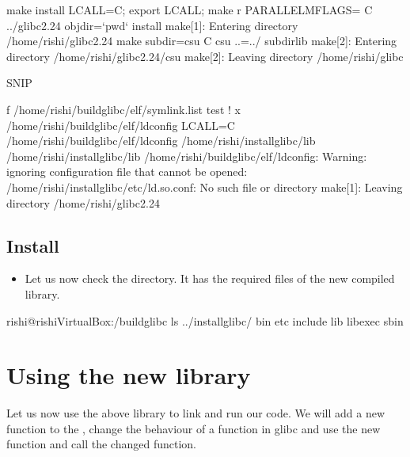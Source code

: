 \documentclass[letterpaper,10pt,english]{sphinxmanual}
\begin{document}
\begin{sphinxVerbatim}[commandchars=\\\{\}]
\PYGZdl{} make install
LC\PYGZus{}ALL=C; export LC\PYGZus{}ALL; \PYGZbs{}
make \PYGZhy{}r PARALLELMFLAGS=\PYGZdq{}\PYGZdq{} \PYGZhy{}C ../glibc\PYGZhy{}2.24 objdir={}`pwd{}` install
make[1]: Entering directory \PYGZsq{}/home/rishi/glibc\PYGZhy{}2.24\PYGZsq{}
make  subdir=csu \PYGZhy{}C csu ..=../ subdir\PYGZus{}lib
make[2]: Entering directory \PYGZsq{}/home/rishi/glibc\PYGZhy{}2.24/csu\PYGZsq{}
make[2]: Leaving directory \PYGZsq{}/home/rishi/glibc\PYGZhy{}

\PYGZgt{}\PYGZgt{}\PYGZgt{}\PYGZgt{}\PYGZgt{}\PYGZgt{}\PYGZgt{}\PYGZgt{}\PYGZgt{}\PYGZgt{}\PYGZgt{}SNIP\PYGZlt{}\PYGZlt{}\PYGZlt{}\PYGZlt{}\PYGZlt{}\PYGZlt{}\PYGZlt{}\PYGZlt{}\PYGZlt{}\PYGZlt{}\PYGZlt{}\PYGZlt{}\PYGZlt{}\PYGZlt{}\PYGZlt{}

 \PYGZhy{}f /home/rishi/build\PYGZus{}glibc/elf/symlink.list
 test ! \PYGZhy{}x /home/rishi/build\PYGZus{}glibc/elf/ldconfig \textbar{}\textbar{} LC\PYGZus{}ALL=C \PYGZbs{}
   /home/rishi/build\PYGZus{}glibc/elf/ldconfig  \PYGZbs{}
            /home/rishi/install\PYGZus{}glibc/lib /home/rishi/install\PYGZus{}glibc/lib
            /home/rishi/build\PYGZus{}glibc/elf/ldconfig: Warning: ignoring configuration file that cannot be opened: /home/rishi/install\PYGZus{}glibc/etc/ld.so.conf: No such file or directory
            make[1]: Leaving directory \PYGZsq{}/home/rishi/glibc\PYGZhy{}2.24\PYGZsq{}
\end{sphinxVerbatim}


\subsection{Install}
\label{\detokenize{03_glibc:install}}\begin{itemize}
\item {} 
Let us now check the  directory. It has the required files of the new compiled library.

\end{itemize}

\begin{sphinxVerbatim}[commandchars=\\\{\}]
rishi@rishi\PYGZhy{}VirtualBox:\PYGZti{}/build\PYGZus{}glibc\PYGZdl{} ls ../install\PYGZus{}glibc/
bin  etc  include  lib  libexec  sbin
\end{sphinxVerbatim}


\section{Using the new library}
\label{\detokenize{03_glibc:using-the-new-library}}
Let us now use the above library to link and run our code. We will add a new
function to the , change the behaviour of a function in glibc and use the
new function and call the changed function.
\end{document}
